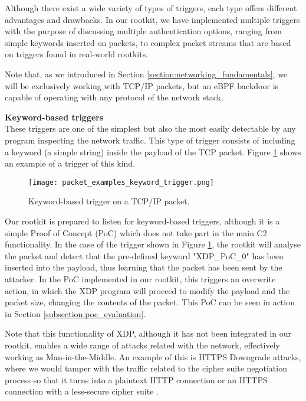 Although there exist a wide variety of types of triggers, each type offers different advantages and drawbacks. In our rootkit, we have implemented multiple triggers with the purpose of discussing multiple authentication options, ranging from simple keywords inserted on packets, to complex packet streams that are based on triggers found in real-world rootkits.

Note that, as we introduced in Section \ref{section:networking_fundamentals}, we will be exclusively working with TCP/IP packets, but an eBPF backdoor is capable of operating with any protocol of the network stack.

\textbf{Keyword-based triggers}\\
These triggers are one of the simplest but also the most easily detectable by any program inspecting the network traffic. This type of trigger consists of including a keyword (a simple string) inside the payload of the TCP packet. Figure \ref{fig:keyword_trigger} shows an example of a trigger of this kind.

\begin{figure}[htbp]
	\centering
	\texttt{[image: packet\_examples\_keyword\_trigger.png]}
	\caption{Keyword-based trigger on a TCP/IP packet.}
	\label{fig:keyword_trigger}
\end{figure}

Our rootkit is prepared to listen for keyword-based triggers, although it is a simple Proof of Concept (PoC) which does not take part in the main C2 functionality. In the case of the trigger shown in Figure \ref{fig:keyword_trigger}, the rootkit will analyse the packet and detect that the pre-defined keyword "XDP\_PoC\_0" has been inserted into the payload, thus learning that the packet has been sent by the attacker. In the PoC implemented in our rootkit, this triggers an overwrite action, in which the XDP program will proceed to modify the payload and the packet size, changing the contents of the packet. This PoC can be seen in action in Section \ref{subsection:poc_evaluation}.

Note that this functionality of XDP, although it has not been integrated in our rootkit, enables a wide range of attacks related with the network, effectively working as Man-in-the-Middle. An example of this is HTTPS Downgrade attacks, where we would tamper with the traffic related to the cipher suite negotiation process so that it turns into a plaintext HTTP connection or an HTTPS connection with a less-secure cipher suite \cite{downgrade_attack}.

